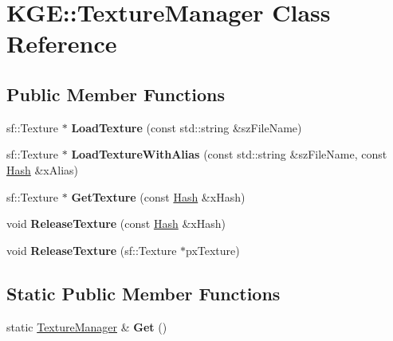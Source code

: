\hypertarget{class_k_g_e_1_1_texture_manager}{\section{K\-G\-E\-:\-:Texture\-Manager Class Reference}
\label{class_k_g_e_1_1_texture_manager}
}
\subsection*{Public Member Functions}
\begin{DoxyCompactItemize}
\item 
\hypertarget{class_k_g_e_1_1_texture_manager_a7d740cf85dc9df88e3c6853d35d5c753}{sf\-::\-Texture $\ast$ {\bfseries Load\-Texture} (const std\-::string \&sz\-File\-Name)}\label{class_k_g_e_1_1_texture_manager_a7d740cf85dc9df88e3c6853d35d5c753}

\item 
\hypertarget{class_k_g_e_1_1_texture_manager_a1abdbc9f8ef1fe47c0bb7513a822f3fa}{sf\-::\-Texture $\ast$ {\bfseries Load\-Texture\-With\-Alias} (const std\-::string \&sz\-File\-Name, const \hyperlink{class_k_g_e_1_1_hash}{Hash} \&x\-Alias)}\label{class_k_g_e_1_1_texture_manager_a1abdbc9f8ef1fe47c0bb7513a822f3fa}

\item 
\hypertarget{class_k_g_e_1_1_texture_manager_a4ea7f58cfcc584a0f02f992bae5761df}{sf\-::\-Texture $\ast$ {\bfseries Get\-Texture} (const \hyperlink{class_k_g_e_1_1_hash}{Hash} \&x\-Hash)}\label{class_k_g_e_1_1_texture_manager_a4ea7f58cfcc584a0f02f992bae5761df}

\item 
\hypertarget{class_k_g_e_1_1_texture_manager_a59541f59c443cb7590d890fbfcadcce4}{void {\bfseries Release\-Texture} (const \hyperlink{class_k_g_e_1_1_hash}{Hash} \&x\-Hash)}\label{class_k_g_e_1_1_texture_manager_a59541f59c443cb7590d890fbfcadcce4}

\item 
\hypertarget{class_k_g_e_1_1_texture_manager_a3b556b077b352cab09b33f3e35f29ee9}{void {\bfseries Release\-Texture} (sf\-::\-Texture $\ast$px\-Texture)}\label{class_k_g_e_1_1_texture_manager_a3b556b077b352cab09b33f3e35f29ee9}

\end{DoxyCompactItemize}
\subsection*{Static Public Member Functions}
\begin{DoxyCompactItemize}
\item 
\hypertarget{class_k_g_e_1_1_texture_manager_a578aaeb0808f1f42299057cae1f6c3d1}{static \hyperlink{class_k_g_e_1_1_texture_manager}{Texture\-Manager} \& {\bfseries Get} ()}\label{class_k_g_e_1_1_texture_manager_a578aaeb0808f1f42299057cae1f6c3d1}

\end{DoxyCompactItemize}
